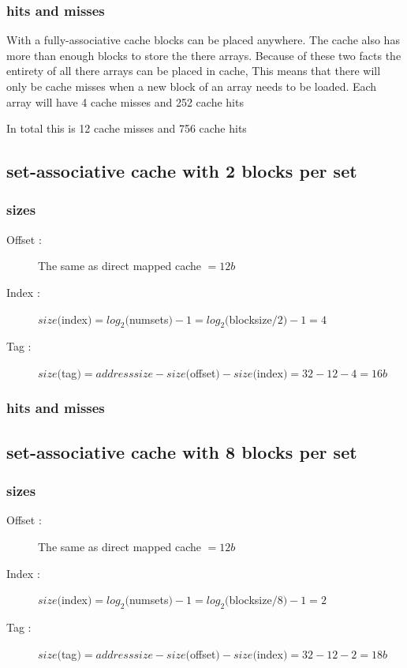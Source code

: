 \documentclass[12pt]{article}
\begin{document}
      \subsubsection{hits and misses}
		With a fully-associative cache blocks can be placed anywhere. The cache also has more than enough blocks to store the there arrays. Because of these two facts the entirety of all there arrays can be placed in cache, This means that there will only be cache misses when a new block of an array needs to be loaded. Each array will have 4 cache misses and 252 cache hits 
        
        In total this is 12 cache misses and 756 cache hits
        
    \subsection{set-associative cache with 2 blocks per set}
    
      \subsubsection{sizes}
        \begin{description}
          \item[Offset : ] The same as direct mapped cache $ = 12 b$
          \item[Index : ] $size($index$) = log_2($numsets$) -1 = log_2($blocksize$/2) -1 = 4$
          \item[Tag : ] $size($tag$) = addresssize- size($offset$) - size($index$) = 32 - 12 -4 = 16b$
        \end{description}
        
      \subsubsection{hits and misses}

    \subsection{set-associative cache with 8 blocks per set}
    
      \subsubsection{sizes}
        \begin{description}
          \item[Offset : ] The same as direct mapped cache $ = 12 b$
          \item[Index : ] $size($index$) = log_2($numsets$) -1 = log_2($blocksize$/8) - 1 = 2$
          \item[Tag : ] $size($tag$) = addresssize- size($offset$) - size($index$) = 32 - 12 -2 = 18b$
        \end{description}
        
\end{document}
